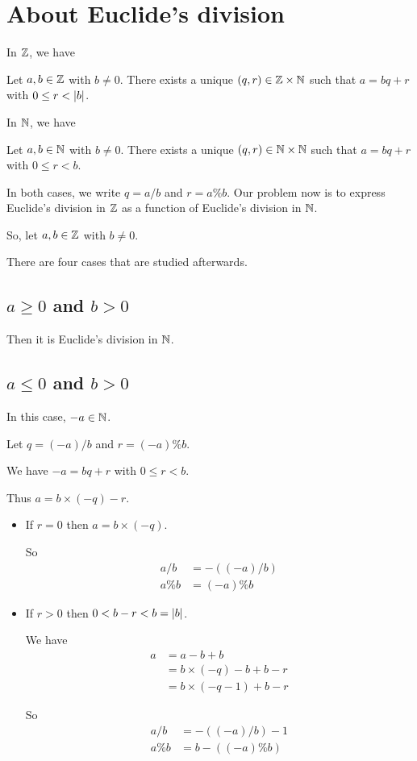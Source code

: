 \chapter{About Euclide's division}

In $\mathbb{Z}$, we have
\begin{theorem}
  Let $a, b \in \mathbb{Z}$ with $b \neq 0$. There exists a unique $(q,r) \in
  \mathbb{Z} \times \mathbb{N}$ such that $a = b q + r$ with $0 \leq r < | b |$.
\end{theorem}

In $\mathbb{N}$, we have
\begin{theorem}
  Let $a, b \in \mathbb{N}$ with $b \neq 0$. There exists a unique $(q,r) \in
  \mathbb{N} \times \mathbb{N}$ such that $a = b q + r$ with $0 \leq r < b$.
\end{theorem}

In both cases, we write $q = a / b$ and $r = a \% b$. Our problem now
is to express Euclide's division in $\mathbb{Z}$ as a function of Euclide's
division in $\mathbb{N}$.

So, let $a, b \in \mathbb{Z}$ with $b \neq 0$. 

There are four cases that are studied afterwards.

\section{$a \geq 0$ and $b > 0$}
Then it is Euclide's division in $\mathbb{N}$.

\section{$a \leq 0$ and $b > 0$}
In this case, $-a \in \mathbb{N}$.

Let $q = (-a) / b$ and $r = (-a) \% b$.

We have $-a = b q + r$ with $0 \leq r < b$.

Thus $a = b \times (-q) - r$.

\begin{itemize}
\item If $r = 0$ then $a = b \times (-q)$.

  So
  \begin{align*}
    a / b & = - ((-a) / b) \\
    a \% b & = (-a) \% b
  \end{align*}

\item If $r > 0$ then $0 < b - r < b = | b |$.

  We have 
  \begin{align*}
    a & = a - b + b \\
    & = b \times (-q) -b + b - r \\
    & = b \times (-q-1) + b - r
  \end{align*}

  So
  \begin{align*}
    a / b & = - ((-a) / b) - 1 \\
    a \% b & = b - ((-a) \% b)
  \end{align*}
\end{itemize}

